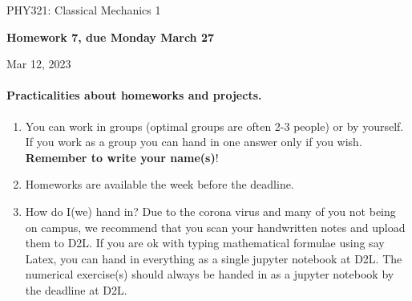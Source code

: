 \documentclass[%
oneside,                 %
final,                   %
10pt]{article}
\begin{document}

\newcommand{\exercisesection}[1]{\subsection*{#1}}






\thispagestyle{empty}

\begin{center}
{\LARGE\bf
\begin{spacing}{1.25}
PHY321: Classical Mechanics 1
\end{spacing}
}
\end{center}


\begin{center}
{\bf Homework 7, due Monday  March 27${}^{}$} \\ [0mm]
\end{center}

\begin{center}
\end{center}
    

\begin{center}
Mar 12, 2023
\end{center}

\vspace{1cm}


\paragraph{Practicalities about  homeworks and projects.}
\begin{enumerate}
\item You can work in groups (optimal groups are often 2-3 people) or by yourself. If you work as a group you can hand in one answer only if you wish. \textbf{Remember to write your name(s)}!

\item Homeworks are available  the week before the deadline. 

\item How do I(we)  hand in?  Due to the corona virus and many of you not being on campus, we recommend that you scan your handwritten notes and upload them to D2L. If you are ok with typing mathematical formulae using say Latex, you can hand in everything as a single jupyter notebook at D2L. The numerical exercise(s) should always be handed in as a jupyter notebook by the deadline at D2L. 
\end{enumerate}
\end{document}

